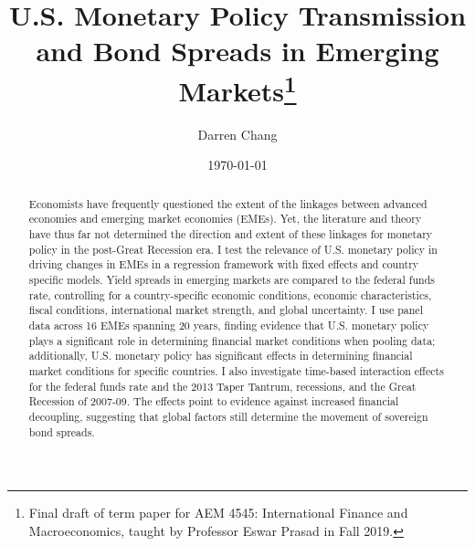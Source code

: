 \documentclass[12pt]{article}
\begin{document}

\newcommand{\tit}{U.S. Monetary Policy Transmission and Bond Spreads in Emerging Markets}

\newcommand{\ack}{Final draft of term paper for AEM 4545: International Finance and Macroeconomics, taught by Professor Eswar Prasad in Fall 2019.}

\newcommand{\abs}{\noindent Economists have frequently questioned the extent of the linkages between advanced economies and  emerging market economies (EMEs). Yet, the literature and theory have thus far not determined the direction and extent of these linkages for monetary policy in the post-Great Recession era. I test the relevance of U.S. monetary policy in driving changes in EMEs in a regression framework with fixed effects and country specific models. Yield spreads in emerging markets are compared to the federal funds rate, controlling for a country-specific economic conditions, economic characteristics, fiscal conditions, international market strength, and global uncertainty. I use panel data across 16 EMEs spanning 20 years, finding evidence that U.S. monetary policy plays a significant role in determining financial market conditions when pooling data; additionally, U.S. monetary policy has significant effects in determining financial market conditions for specific countries. I also investigate time-based interaction effects for the federal funds rate and the 2013 Taper Tantrum, recessions, and the Great Recession of 2007-09. The effects point to evidence against increased financial decoupling, suggesting that global factors still determine the movement of sovereign bond spreads.
}

\title{\tit{\thanks{\ack}}}

\author{Darren Chang}
\date{{\today}}

\maketitle
\thispagestyle{empty}

\begin{abstract}
  \abs  
\end{abstract}

\newpage
\doublespacing
\setcounter{page}{1}

\end{document}
